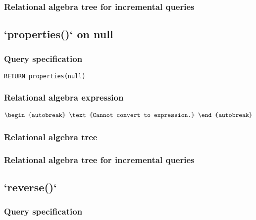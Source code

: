\subsubsection*{Relational algebra tree for incremental queries}


\subsection{`properties()` on null}

\subsubsection*{Query specification}

\begin{lstlisting}
RETURN properties(null)
\end{lstlisting}

\subsubsection*{Relational algebra expression}

\begin{align*}
\begin{autobreak}
\text{Cannot convert to expression.}
\end{autobreak}
\end{align*}

\subsubsection*{Relational algebra tree}


\subsubsection*{Relational algebra tree for incremental queries}


\subsection{`reverse()`}

\subsubsection*{Query specification}

